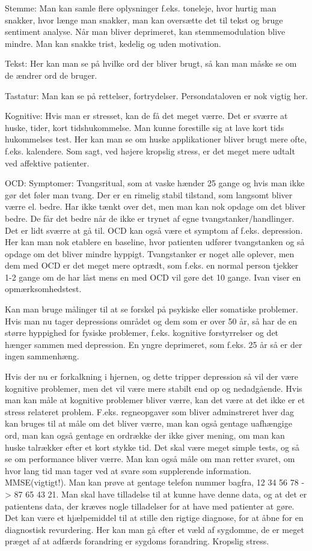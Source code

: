 Stemme: Man kan samle flere oplysninger f.eks. toneleje, hvor hurtig man snakker, hvor længe man snakker, man kan oversætte det til tekst og bruge sentiment analyse. Når man bliver deprimeret, kan stemmemodulation blive mindre. Man kan snakke trist, kedelig og uden motivation.

Tekst: Her kan man se på hvilke ord der bliver brugt, så kan man måske se om de ændrer ord de bruger. 

Tastatur: Man kan se på rettelser, fortrydelser. Persondataloven er nok vigtig her.

Kognitive: Hvis man er stresset, kan de få det meget værre. Det er sværre at huske, tider, kort tidshukommelse. Man kunne forestille sig at lave kort tids hukommelses test. Her kan man se om huske applikationer bliver brugt mere ofte, f.eks. kalendere. Som sagt, ved højere kropslig stress, er det meget mere udtalt ved affektive patienter.

OCD: Symptomer: Tvangsritual, som at vaske hænder 25 gange og hvis man ikke gør det føler man tvang. Der er en rimelig stabil tilstand, som langsomt bliver værre el. bedre. Har ikke tænkt over det, men man kan nok opdage om det bliver bedre. De får det bedre når de ikke er trynet af egne tvangstanker/handlinger. Det er lidt sværre at gå til. OCD kan også være et symptom af f.eks. depression. Her kan man nok etablere en baseline, hvor patienten udfører tvangstanken og så opdage om det bliver mindre hyppigt. Tvangstanker er noget alle oplever, men dem med OCD er det meget mere optrædt, som f.eks. en normal person tjekker 1-2 gange om de har låst mens en med OCD vil gøre det 10 gange. 
Ivan viser en opmærksomhedstest.

Kan man bruge målinger til at se forskel på psykiske eller somatiske problemer. Hvis man nu tager depressions området og dem som er over 50 år, så har de en større hyppighed for fysiske problemer, f.eks. kognitive forstyrrelser og det hænger sammen med depression. En yngre deprimeret, som f.eks. 25 år så er der ingen sammenhæng.

Hvis der nu er forkalkning i hjernen, og dette tripper depression så vil der være kognitive problemer, men det vil være mere stabilt end op og nedadgående. Hvis man kan måle at kognitive problemer bliver værre, kan det være at det ikke er et stress relateret problem. F.eks. regneopgaver som bliver adminstreret hver dag kan bruges til at måle om det bliver værre, man kan også gentage uafhængige ord, man kan også gentage en ordrække der ikke giver mening, om man kan huske talrækker efter et kort stykke tid. Det skal være meget simple tests, og så se om performance bliver værre. Man kan også måle om man retter svaret, om hvor lang tid man tager ved at svare som supplerende information. MMSE(vigtigt!). Man kan prøve at gentage telefon nummer bagfra, 12 34 56 78 -> 87 65 43 21. Man skal have tilladelse til at kunne have denne data, og at det er patientens data, der kræves nogle tilladelser for at have med patienter at gøre. Det kan være et hjælpemiddel til at stille den rigtige diagnose, for at åbne for en diagnostisk revurdering. Her kan man gå efter et væld af sygdomme, de er meget præget af at adfærds forandring er sygdoms forandring. Kropslig stress. 

